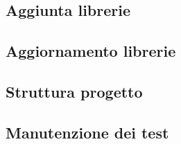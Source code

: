 \subsection{Aggiunta librerie}

\subsection{Aggiornamento librerie}

\subsection{Struttura progetto}

\subsection{Manutenzione dei test}
